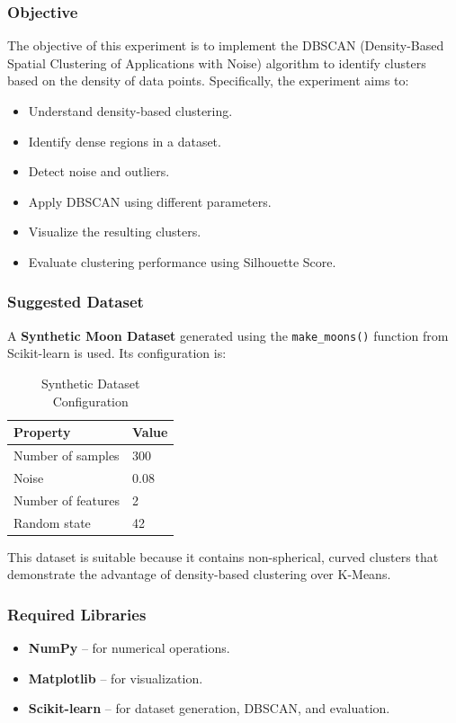 \documentclass[a4paper,11pt]{article}
\begin{document}
\subsubsection{Objective}
The objective of this experiment is to implement the DBSCAN (Density-Based Spatial Clustering of Applications with Noise) algorithm to identify clusters based on the density of data points. Specifically, the experiment aims to:
\begin{itemize}
    \item Understand density-based clustering.
    \item Identify dense regions in a dataset.
    \item Detect noise and outliers.
    \item Apply DBSCAN using different parameters.
    \item Visualize the resulting clusters.
    \item Evaluate clustering performance using Silhouette Score.
\end{itemize}

\subsubsection{Suggested Dataset}
A \textbf{Synthetic Moon Dataset} generated using the \texttt{make\_moons()} function from Scikit-learn is used. Its configuration is:

\begin{table}[H]
\centering
\caption{Synthetic Dataset Configuration}
\begin{tabular}{ll}
\toprule
\textbf{Property} & \textbf{Value} \\
\midrule
Number of samples  & 300 \\
Noise              & 0.08 \\
Number of features & 2 \\
Random state       & 42 \\
\bottomrule
\end{tabular}
\end{table}

This dataset is suitable because it contains non-spherical, curved clusters that demonstrate the advantage of density-based clustering over K-Means.

\subsubsection{Required Libraries}
\begin{itemize}
    \item \textbf{NumPy} -- for numerical operations.
    \item \textbf{Matplotlib} -- for visualization.
    \item \textbf{Scikit-learn} -- for dataset generation, DBSCAN, and evaluation.
\end{itemize}
\end{document}
